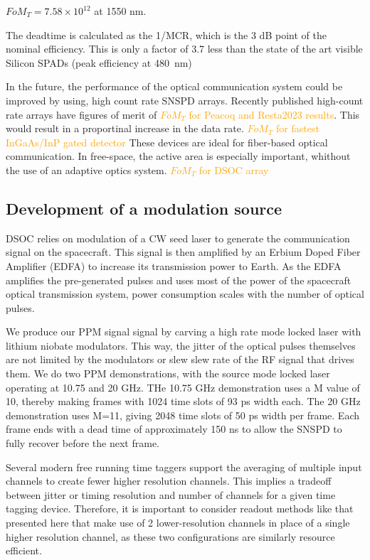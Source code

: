 \documentclass[11pt]{caltech_thesis} %
\begin{document}
$FoM_T = 7.58 \times 10^{12}$ at 1550 nm.

The deadtime is calculated as the 1/MCR, which is the 3 dB point of the
nominal efficiency. This is only a factor of 3.7 less than the state of
the art visible Silicon SPADs (peak efficiency at 480~nm)
\autocite{Gramuglia2022}

In the future, the performance of the optical communication system could
be improved by using, high count rate SNSPD arrays. Recently published
high-count rate arrays have figures of merit of
\textcolor{orange}{$FoM_T$ for Peacoq and Resta2023 results}. This would
result in a proportinal increase in the data rate.
\textcolor{orange}{$FoM_T$ for fastest InGaAs/InP gated detector} These
devices are ideal for fiber-based optical communication. In free-space,
the active area is especially important, whithout the use of an adaptive
optics system. \textcolor{orange}{$FoM_T$ for DSOC array}

\hypertarget{development-of-a-modulation-source}{%
\subsection{Development of a modulation
source}\label{development-of-a-modulation-source}}

DSOC relies on modulation of a CW seed laser to generate the
communication signal on the spacecraft. This signal is then amplified by
an Erbium Doped Fiber Amplifier (EDFA) to increase its transmission
power to Earth. As the EDFA amplifies the pre-generated pulses and uses
most of the power of the spacecraft optical transmission system, power
consumption scales with the number of optical pulses.

We produce our PPM signal signal by carving a high rate mode locked
laser with lithium niobate modulators. This way, the jitter of the
optical pulses themselves are not limited by the modulators or slew slew
rate of the RF signal that drives them. We do two PPM demonstrations,
with the source mode locked laser operating at 10.75 and 20 GHz. THe
10.75 GHz demonstration uses a M value of 10, thereby making frames with
1024 time slots of 93 ps width each. The 20 GHz demonstration uses M=11,
giving 2048 time slots of 50 ps width per frame. Each frame ends with a
dead time of approximately 150 ns to allow the SNSPD to fully recover
before the next frame.

Several modern free running time taggers support the averaging of
multiple input channels to create fewer higher resolution channels. This
implies a tradeoff between jitter or timing resolution and number of
channels for a given time tagging device. Therefore, it is important to
consider readout methods like that presented here that make use of 2
lower-resolution channels in place of a single higher resolution
channel, as these two configurations are similarly resource efficient.
\end{document}
